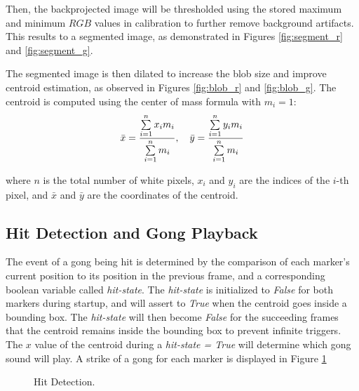 \documentclass[10pt,a4paper,twoside]{article}
\begin{document}
Then, the backprojected image will be thresholded using the stored maximum and minimum $RGB$ values in calibration to further remove background artifacts.  This results to a segmented image, as demonstrated in Figures \ref{fig:segment_r} and 
\ref{fig:segment_g}. 

The segmented image is then dilated to increase the blob size and improve centroid estimation, as observed in Figures \ref{fig:blob_r} and \ref{fig:blob_g}. The centroid is computed using the center of mass formula with $m_i = 1$:
\begin{equation}
    \centering
    \bar{x} = \dfrac{\sum\limits_{i=1}^n x_i m_i}{\sum\limits_{i=1}^n m_i},
    \quad
    \bar{y} = \dfrac{\sum\limits_{i=1}^n y_i m_i}{\sum\limits_{i=1}^n m_i}
\end{equation}{}

where $n$ is the total number of white pixels, $x_i$ and $y_i$ are the indices of the $i$-th pixel, and $\bar{x}$ and $\bar{y}$ are the coordinates of the centroid.

\subsection{Hit Detection and Gong Playback}
The event of a gong being hit is determined by the comparison of each marker's current position to its position in the previous frame, and a corresponding boolean variable called \emph{hit-state}. The \emph{hit-state} is initialized to \emph{False} for both markers during startup, and will assert to \emph{True} when the centroid goes inside a bounding box. The \emph{hit-state} will then become \emph{False} for the succeeding frames that the centroid remains inside the bounding box to prevent infinite triggers. The $x$ value of the centroid during a \emph{hit-state = True} will determine which gong sound will play. A strike of a gong for each marker is displayed in Figure \ref{fig:hit-detect} 

\begin{figure}[tbp]
    \centering
    \label{fig:hit_green}
    \quad 
    \label{fig:hit_red}
    \caption{Hit Detection.}\label{fig:hit-detect}
\end{figure}
\end{document}
